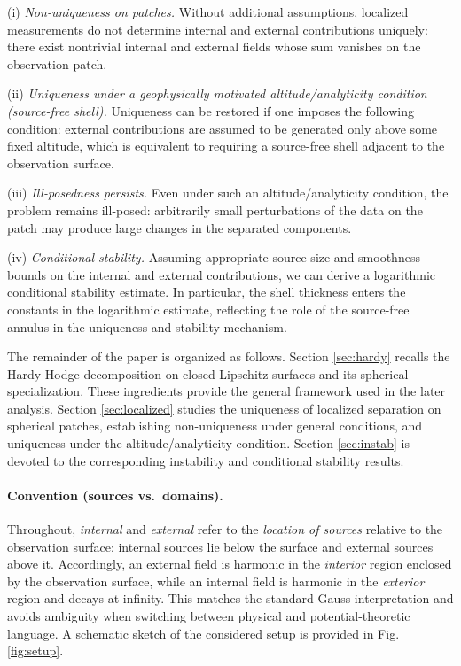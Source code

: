 \documentclass[a4paper, 11pt]{article}
\begin{document}
\smallskip
\noindent
(i) \emph{Non-uniqueness on patches.} Without additional assumptions, localized measurements do not determine internal and external contributions uniquely: there exist nontrivial internal and external fields whose sum vanishes on the observation patch.

\smallskip
\noindent
(ii) \emph{Uniqueness under a geophysically motivated altitude/analyticity condition (source-free shell).}
Uniqueness can be restored if one imposes the following condition: external contributions are assumed to be generated only above some fixed altitude, which is equivalent to requiring a source-free shell adjacent to the observation surface.

\smallskip
\noindent
(iii) \emph{Ill-posedness persists.} Even under such an altitude/analyticity condition, the problem remains  ill-posed: arbitrarily small perturbations of the data on the patch may produce large changes in the separated components.

\smallskip
\noindent
(iv) \emph{Conditional stability.} Assuming appropriate source-size and smoothness bounds on the internal and external contributions, we can derive a logarithmic conditional stability estimate. In particular, the shell thickness enters the constants in the logarithmic estimate, reflecting the role of the source-free annulus in the uniqueness and stability mechanism.

\smallskip
The remainder of the paper is organized as follows. Section \ref{sec:hardy} recalls the Hardy-Hodge decomposition on closed Lipschitz surfaces and its spherical specialization. These ingredients provide the general framework used in the later analysis. Section \ref{sec:localized} studies the uniqueness of localized separation on spherical patches, establishing non-uniqueness under general conditions, and uniqueness under the altitude/analyticity condition. Section \ref{sec:instab} is devoted to the corresponding instability and conditional stability results. 

\paragraph{Convention (sources vs.\ domains).}
Throughout, \emph{internal} and \emph{external} refer to the \emph{location of sources} relative to the observation surface: internal sources lie below the surface and external sources above it. 
Accordingly, an external field is harmonic in the \emph{interior} region enclosed by the observation surface, while an internal field is harmonic in the \emph{exterior} region and decays at infinity. This matches the standard Gauss interpretation and avoids ambiguity when switching between physical and potential-theoretic language. A schematic sketch of the considered setup is provided in Fig. \ref{fig:setup}.
\end{document}
